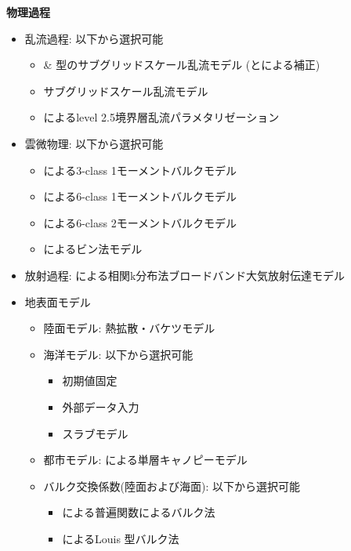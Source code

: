 {\bf 物理過程}
\begin{itemize}
 \item 乱流過程: 以下から選択可能
   \begin{itemize}
    \item \citet{smagorinsky_1963} \& \citet{lilly_1962}型のサブグリッドスケール乱流モデル (\citet{Brown_etal_1994}と\citet{Scotti_1993}による補正)
    \item \citet{Deardorff_1980} サブグリッドスケール乱流モデル
    \item \citet{my_1982,nakanishi_2004}によるlevel 2.5境界層乱流パラメタリゼーション
   \end{itemize}
 \item 雲微物理: 以下から選択可能
   \begin{itemize}
    \item \citet{kessler_1969}による3-class 1モーメントバルクモデル
    \item \citet{tomita_2008}による6-class 1モーメントバルクモデル
    \item \citet{sn_2014}による6-class 2モーメントバルクモデル
    \item \citet{suzuki_etal_2010}によるビン法モデル
   \end{itemize}
 \item 放射過程: \citet{sekiguchi_2008}による相関k分布法ブロードバンド大気放射伝達モデル
 \item 地表面モデル
  \begin{itemize}
   \item 陸面モデル: 熱拡散・バケツモデル
   \item 海洋モデル: 以下から選択可能
   \begin{itemize}
     \item 初期値固定
     \item 外部データ入力
     \item スラブモデル
   \end{itemize}
   \item 都市モデル: \citet{kusaka_2001}による単層キャノピーモデル
   \item バルク交換係数(陸面および海面): 以下から選択可能
   \begin{itemize}
     \item \citet{beljaars_1991,wilson_2001}による普遍関数によるバルク法
     \item \citet{uno_1995}によるLouis 型バルク法
   \end{itemize}
  \end{itemize}
\end{itemize}

